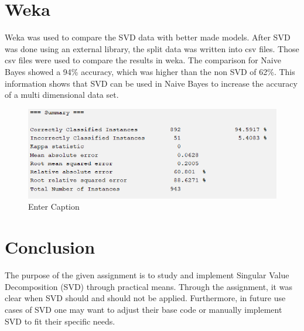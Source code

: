 \documentclass{article}
\begin{document}
\section{Weka}
Weka was used to compare the SVD data with better made models. After SVD was done using an external library, the split data was written into csv files. Those csv files were used to compare the results in weka. The comparison for Naive Bayes showed a 94\% accuracy, which was higher than the non SVD of 62\%. This information shows that SVD can be used in Naive Bayes to increase the accuracy of a multi dimensional data set.
\begin{figure}
    \centering
    \includegraphics[width=0.5\linewidth]{b.png}
    \caption{Enter Caption}
    \label{fig:enter-label}
\end{figure}
\section{Conclusion}
The purpose of the given assignment is to study and implement Singular Value Decomposition (SVD) through practical means. Through the assignment, it was clear when SVD should and should not be applied. Furthermore, in future use cases of SVD one may want to adjust their base code or manually implement SVD to fit their specific needs.
\end{document}
